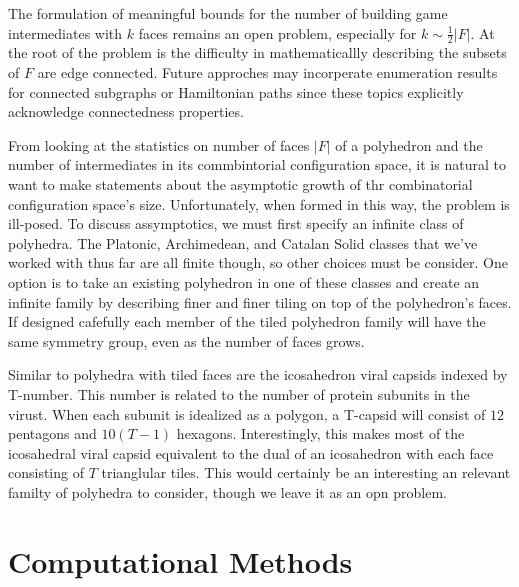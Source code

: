 The formulation of meaningful bounds for the number of building game intermediates with $k$ faces remains an open problem, especially for $k \sim \frac{1}{2}|F|$. At the root of the problem is the difficulty in mathematicallly describing the subsets of $F$ are edge connected. Future approches may incorperate enumeration results for connected subgraphs or Hamiltonian paths since these topics explicitly acknowledge connectedness properties. 

From looking at the statistics on number of faces $|F|$ of a polyhedron and the number of intermediates in its commbintorial configuration space, it is natural to want to make statements about the asymptotic growth of thr combinatorial configuration space's size. Unfortunately, when formed in this way, the problem is ill-posed. To discuss assymptotics, we must first specify an infinite class of polyhedra. The Platonic, Archimedean, and Catalan Solid classes that we've worked with thus far are all finite though, so other choices must be consider. One option is to take an existing polyhedron in one of these classes and create an infinite family by describing finer and finer tiling on top of the polyhedron's faces. If designed cafefully each member of the tiled polyhedron family will have the same symmetry group, even as the number of faces grows. 

Similar to polyhedra with tiled faces are the icosahedron viral capsids indexed by T-number. This number is related to the number of protein subunits in the virust. When each subunit is idealized as a polygon, a T-capsid will consist of $12$ pentagons and $10(T-1)$ hexagons. Interestingly, this makes most of the icosahedral viral capsid equivalent to the dual of an icosahedron with each face consisting of $T$ trianglular tiles. This would certainly be an interesting an relevant familty of polyhedra to consider, though we leave it as an opn problem.

\section{Computational Methods}

